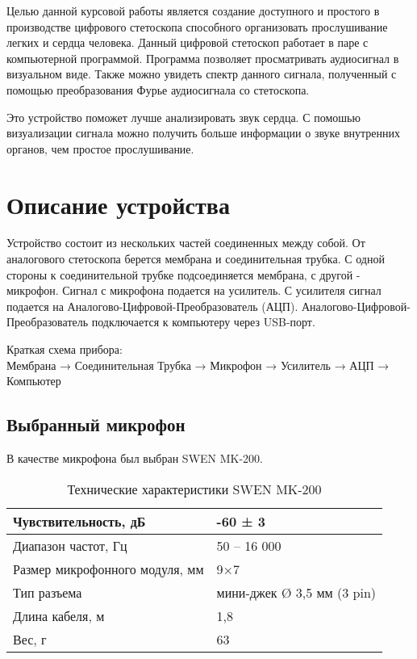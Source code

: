Целью данной курсовой работы является создание доступного и простого в производстве цифрового стетоскопа способного организовать прослушивание легких и сердца человека. Данный цифровой стетоскоп работает в паре с компьютерной программой. Программа позволяет просматривать аудиосигнал в визуальном виде. Также можно увидеть спектр данного сигнала, полученный с помощью преобразования Фурье аудиосигнала со стетоскопа.

Это устройство поможет лучше анализировать звук сердца. С помошью визуализации сигнала можно получить больше информации о звуке внутренних органов, чем простое прослушивание.
\newpage 
\section{Описание устройства}
Устройство состоит из нескольких частей соединенных между собой. От аналогового стетоскопа берется мембрана и соединительная трубка. С одной стороны к соединительной трубке подсоединяется мембрана, с другой - микрофон. Сигнал с микрофона подается на усилитель. С усилителя сигнал подается на Аналогово-Цифровой-Преобразователь (АЦП). Аналогово-Цифровой-Преобразователь подключается к компьютеру через USB-порт.

\begin{center}
Краткая схема прибора: \\[0.4cm]

\noindent\scriptsize{{Мембрана → Соединительная Трубка → Микрофон → Усилитель → АЦП → Компьютер}}
\end{center}
\label{sec:examples}

\subsection{Выбранный микрофон}

В качестве микрофона был выбран SWEN MK-200. \\

\begin{table}[h]
\centering
\caption{Технические характеристики SWEN MK-200}
\label{my-label}
\begin{tabular}{|l|l|}
\hline
Чувствительность, дБ           & -60 ± 3                    \\ \hline
Диапазон частот, Гц            & 50 – 16 000                \\ \hline
Размер микрофонного модуля, мм & 9×7                        \\ \hline
Тип разъема                    & мини-джек Ø 3,5 мм (3 pin) \\ \hline
Длина кабеля, м                & 1,8                        \\ \hline
Вес, г                         & 63                         \\ \hline
\end{tabular}
\end{table}


